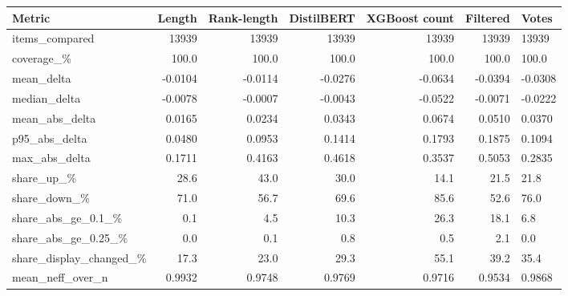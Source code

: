 \begin{tabular}{lrrrrr}
\hline
Metric & Length & Rank-length & DistilBERT & XGBoost count & Filtered & Votes \\
\hline
items\_compared & 13939 & 13939 & 13939 & 13939 & 13939 & 13939 \\
\hline
coverage\_\% & 100.0 & 100.0 & 100.0 & 100.0 & 100.0 & 100.0 \\
\hline
mean\_delta & -0.0104 & -0.0114 & -0.0276 & -0.0634 & -0.0394 & -0.0308 \\
\hline
median\_delta & -0.0078 & -0.0007 & -0.0043 & -0.0522 & -0.0071 & -0.0222 \\
\hline
mean\_abs\_delta & 0.0165 & 0.0234 & 0.0343 & 0.0674 & 0.0510 & 0.0370 \\
\hline
p95\_abs\_delta & 0.0480 & 0.0953 & 0.1414 & 0.1793 & 0.1875 & 0.1094 \\
\hline
max\_abs\_delta & 0.1711 & 0.4163 & 0.4618 & 0.3537 & 0.5053 & 0.2835 \\
\hline
share\_up\_\% & 28.6 & 43.0 & 30.0 & 14.1 & 21.5 & 21.8 \\
\hline
share\_down\_\% & 71.0 & 56.7 & 69.6 & 85.6 & 52.6 & 76.0 \\
\hline
share\_abs\_ge\_0.1\_\% & 0.1 & 4.5 & 10.3 & 26.3 & 18.1 & 6.8 \\
\hline
share\_abs\_ge\_0.25\_\% & 0.0 & 0.1 & 0.8 & 0.5 & 2.1 & 0.0 \\
\hline
share\_display\_changed\_\% & 17.3 & 23.0 & 29.3 & 55.1 & 39.2 & 35.4 \\
\hline
mean\_neff\_over\_n & 0.9932 & 0.9748 & 0.9769 & 0.9716 & 0.9534 & 0.9868 \\
\hline
\end{tabular}
